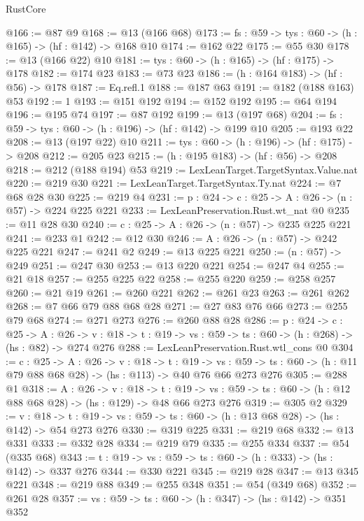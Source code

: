 \begin{lexlean}{RustCore}
\begin{coremodule}
@166 := @87 @9
@168 := @13 (@166 @68)
@173 := {fs : @59} -> {tys : @60} -> (h : @165) -> (hf : @142) -> @168 @10
@174 := @162 @22
@175 := @55 @30
@178 := @13 (@166 @22) @10
@181 := {tys : @60} -> (h : @165) -> (hf : @175) -> @178
@182 := @174 @23
@183 := @73 @23
@186 := (h : @164 @183) -> (hf : @56) -> @178
@187 := Eq.refl.{1}
@188 := @187 @63
@191 := @182 (@188 @163) @53
@192 := 1
@193 := @151 @192
@194 := @152 @192
@195 := @64 @194
@196 := @195 @74
@197 := @87 @192
@199 := @13 (@197 @68)
@204 := {fs : @59} -> {tys : @60} -> (h : @196) -> (hf : @142) -> @199 @10
@205 := @193 @22
@208 := @13 (@197 @22) @10
@211 := {tys : @60} -> (h : @196) -> (hf : @175) -> @208
@212 := @205 @23
@215 := (h : @195 @183) -> (hf : @56) -> @208
@218 := @212 (@188 @194) @53
@219 := LexLeanTarget.TargetSyntax.Value.nat
@220 := @219 @30
@221 := LexLeanTarget.TargetSyntax.Ty.nat
@224 := @7 @68 @28 @30
@225 := @219 @4
@231 := {p : @24} -> {c : @25} -> {A : @26} -> (n : @57) -> @224 @225 @221
@233 := LexLeanPreservation.Rust.wt_nat @0
@235 := @11 @28 @30
@240 := {c : @25} -> {A : @26} -> (n : @57) -> @235 @225 @221
@241 := @233 @1
@242 := @12 @30
@246 := {A : @26} -> (n : @57) -> @242 @225 @221
@247 := @241 @2
@249 := @13 @225 @221
@250 := (n : @57) -> @249
@251 := @247 @30
@253 := @13 @220 @221
@254 := @247 @4
@255 := @21 @18
@257 := @255 @225 @22
@258 := @255 @220
@259 := @258 @257
@260 := @21 @19
@261 := @260 @221
@262 := @261 @23
@263 := @261 @262
@268 := @7 @66 @79 @88 @68 @28
@271 := @27 @83 @76 @66
@273 := @255 @79 @68
@274 := @271 @273
@276 := @260 @88 @28
@286 := {p : @24} ->
  {c : @25} ->
  {A : @26} ->
  {v : @18} -> {t : @19} -> {vs : @59} -> {ts : @60} -> (h : @268) -> (hs : @82) -> @274 @276
@288 := LexLeanPreservation.Rust.wtl_cons @0
@304 := {c : @25} ->
  {A : @26} ->
  {v : @18} ->
  {t : @19} ->
  {vs : @59} -> {ts : @60} -> (h : @11 @79 @88 @68 @28) -> (hs : @113) -> @40 @76 @66 @273 @276
@305 := @288 @1
@318 := {A : @26} ->
  {v : @18} ->
  {t : @19} -> {vs : @59} -> {ts : @60} -> (h : @12 @88 @68 @28) -> (hs : @129) -> @48 @66 @273 @276
@319 := @305 @2
@329 := {v : @18} ->
  {t : @19} -> {vs : @59} -> {ts : @60} -> (h : @13 @68 @28) -> (hs : @142) -> @54 @273 @276
@330 := @319 @225
@331 := @219 @68
@332 := @13 @331
@333 := @332 @28
@334 := @219 @79
@335 := @255 @334
@337 := @54 (@335 @68)
@343 := {t : @19} -> {vs : @59} -> {ts : @60} -> (h : @333) -> (hs : @142) -> @337 @276
@344 := @330 @221
@345 := @219 @28
@347 := @13 @345 @221
@348 := @219 @88
@349 := @255 @348
@351 := @54 (@349 @68)
@352 := @261 @28
@357 := {vs : @59} -> {ts : @60} -> (h : @347) -> (hs : @142) -> @351 @352

\end{coremodule}
\end{lexlean}
